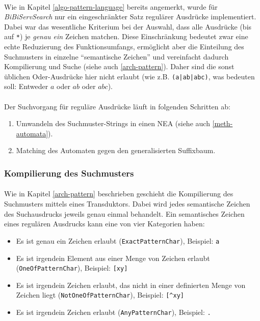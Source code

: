 \paragraph{} Wie in Kapitel \ref{algo-pattern-language} bereits angemerkt, wurde für \textit{BiBiServSearch} nur ein eingeschränkter Satz regulärer Ausdrücke implementiert. Dabei war das wesentliche Kriterium bei der Auswahl, dass alle Ausdrücke (bis auf \texttt{*}) je \textit{genau ein} Zeichen matchen. Diese Einschränkung bedeutet zwar eine echte Reduzierung des Funktionsumfangs, ermöglicht aber die Einteilung des Suchmusters in einzelne "`semantische Zeichen"' und vereinfacht dadurch Kompilierung und Suche (siehe auch \ref{arch-pattern}). Daher sind die sonst üblichen Oder-Ausdrücke hier nicht erlaubt (wie z.B. \texttt{(a|ab|abc)}, was bedeuten soll: Entweder $a$ oder $ab$ oder $abc$).
\paragraph{} Der Suchvorgang für reguläre Ausdrücke läuft in folgenden Schritten ab:

\begin{enumerate}
\item Umwandeln des Suchmuster-Strings in einen NEA (siehe auch \ref{meth-automata}).
\item Matching des Automaten gegen den generalisierten Suffixbaum.
\end{enumerate}

\subsubsection{Kompilierung des Suchmusters}

\paragraph{} Wie in Kapitel \ref{arch-pattern} beschrieben geschieht die Kompilierung des Suchmusters mittels eines Transduktors. Dabei wird jedes semantische Zeichen des Suchausdrucks jeweils genau einmal behandelt. Ein semantisches Zeichen eines regulären Ausdrucks kann eine von vier Kategorien haben:
\begin{itemize}
\item Es ist genau ein Zeichen erlaubt (\texttt{ExactPatternChar}), Beispiel: \texttt{a}
\item Es ist irgendein Element aus einer Menge von Zeichen erlaubt \\(\texttt{OneOfPatternChar}), Beispiel: \texttt{[xy]}
\item Es ist irgendein Zeichen erlaubt, das nicht in einer definierten Menge von Zeichen liegt (\texttt{NotOneOfPatternChar}), Beispiel: \texttt{[\^{ }xy]}
\item Es ist irgendein Zeichen erlaubt (\texttt{AnyPatternChar}), Beispiel: \texttt{.}
\end{itemize}

